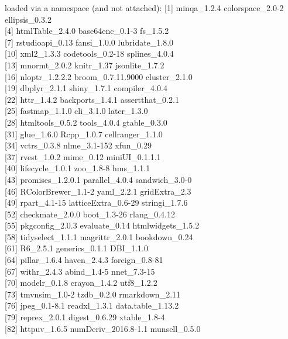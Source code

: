 \documentclass[
  english,
  man, noextraspace,floatsintext]{apa7}
\begin{document}
\begin{appendix}
loaded via a namespace (and not attached): {[}1{]} minqa\_1.2.4
colorspace\_2.0-2 ellipsis\_0.3.2\\
{[}4{]} htmlTable\_2.4.0 base64enc\_0.1-3 fs\_1.5.2\\
{[}7{]} rstudioapi\_0.13 fansi\_1.0.0 lubridate\_1.8.0\\
{[}10{]} xml2\_1.3.3 codetools\_0.2-18 splines\_4.0.4\\
{[}13{]} mnormt\_2.0.2 knitr\_1.37 jsonlite\_1.7.2\\
{[}16{]} nloptr\_1.2.2.2 broom\_0.7.11.9000 cluster\_2.1.0\\
{[}19{]} dbplyr\_2.1.1 shiny\_1.7.1 compiler\_4.0.4\\
{[}22{]} httr\_1.4.2 backports\_1.4.1 assertthat\_0.2.1\\
{[}25{]} fastmap\_1.1.0 cli\_3.1.0 later\_1.3.0\\
{[}28{]} htmltools\_0.5.2 tools\_4.0.4 gtable\_0.3.0\\
{[}31{]} glue\_1.6.0 Rcpp\_1.0.7 cellranger\_1.1.0\\
{[}34{]} vctrs\_0.3.8 nlme\_3.1-152 xfun\_0.29\\
{[}37{]} rvest\_1.0.2 mime\_0.12 miniUI\_0.1.1.1\\
{[}40{]} lifecycle\_1.0.1 zoo\_1.8-8 hms\_1.1.1\\
{[}43{]} promises\_1.2.0.1 parallel\_4.0.4 sandwich\_3.0-0\\
{[}46{]} RColorBrewer\_1.1-2 yaml\_2.2.1 gridExtra\_2.3\\
{[}49{]} rpart\_4.1-15 latticeExtra\_0.6-29 stringi\_1.7.6\\
{[}52{]} checkmate\_2.0.0 boot\_1.3-26 rlang\_0.4.12\\
{[}55{]} pkgconfig\_2.0.3 evaluate\_0.14 htmlwidgets\_1.5.2\\
{[}58{]} tidyselect\_1.1.1 magrittr\_2.0.1 bookdown\_0.24\\
{[}61{]} R6\_2.5.1 generics\_0.1.1 DBI\_1.1.0\\
{[}64{]} pillar\_1.6.4 haven\_2.4.3 foreign\_0.8-81\\
{[}67{]} withr\_2.4.3 abind\_1.4-5 nnet\_7.3-15\\
{[}70{]} modelr\_0.1.8 crayon\_1.4.2 utf8\_1.2.2\\
{[}73{]} tmvnsim\_1.0-2 tzdb\_0.2.0 rmarkdown\_2.11\\
{[}76{]} jpeg\_0.1-8.1 readxl\_1.3.1 data.table\_1.13.2\\
{[}79{]} reprex\_2.0.1 digest\_0.6.29 xtable\_1.8-4\\
{[}82{]} httpuv\_1.6.5 numDeriv\_2016.8-1.1 munsell\_0.5.0


\end{appendix}
\end{document}
